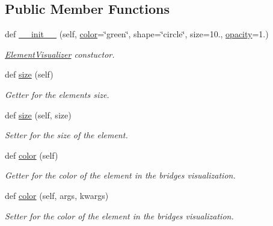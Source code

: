 \subsection*{Public Member Functions}
\begin{DoxyCompactItemize}
\item 
def \hyperlink{classbridges_1_1element__visualizer_1_1_element_visualizer_a27ee5eddf78bac93e2702b2f2203518a}{\+\_\+\+\_\+init\+\_\+\+\_\+} (self, \hyperlink{classbridges_1_1element__visualizer_1_1_element_visualizer_a1fd985698e1c56289ed49fa7849d43ab}{color}=\char`\"{}green\char`\"{}, shape=\char`\"{}circle\char`\"{}, size=10., \hyperlink{classbridges_1_1element__visualizer_1_1_element_visualizer_a64288f56aa9cb5f3ccf703d696df1c04}{opacity}=1.)
\begin{DoxyCompactList}\small\item\em \hyperlink{classbridges_1_1element__visualizer_1_1_element_visualizer}{Element\+Visualizer} constuctor. \end{DoxyCompactList}\item 
def \hyperlink{classbridges_1_1element__visualizer_1_1_element_visualizer_ad3a1c448194330f7122c31f68ed44d49}{size} (self)
\begin{DoxyCompactList}\small\item\em Getter for the elements size. \end{DoxyCompactList}\item 
def \hyperlink{classbridges_1_1element__visualizer_1_1_element_visualizer_adee6d74f47355b75634a9fd5d0ae1714}{size} (self, size)
\begin{DoxyCompactList}\small\item\em Setter for the size of the element. \end{DoxyCompactList}\item 
def \hyperlink{classbridges_1_1element__visualizer_1_1_element_visualizer_acb214c900f5e13f694aa04f284ec55e2}{color} (self)
\begin{DoxyCompactList}\small\item\em Getter for the color of the element in the bridges visualization. \end{DoxyCompactList}\item 
def \hyperlink{classbridges_1_1element__visualizer_1_1_element_visualizer_a8579ca1bda361a0ba44efda8683480bd}{color} (self, args, kwargs)
\begin{DoxyCompactList}\small\item\em Setter for the color of the element in the bridges visualization. \end{DoxyCompactList}\item 

\end{DoxyCompactItemize}
